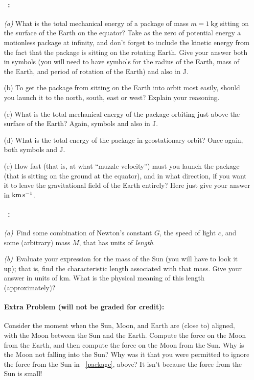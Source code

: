 \documentclass[12pt]{article}
\begin{document}
\paragraph{\problemname~\theproblem:}\label{rocket}%
\textsl{(a)} What is the total mechanical energy of a package of mass
$m= 1~\mathrm{kg}$ sitting on the surface of the Earth on the equator?
Take as the zero of potential energy a motionless package at infinity,
and don't forget to include the kinetic energy from the fact that the
package is sitting on the rotating Earth.  Give your answer both in
symbols (you will need to have symbols for the radius of the Earth,
mass of the Earth, and period of rotation of the Earth) and also in J.

(b) To get the package from sitting on the Earth into orbit most
easily, should you launch it to the north, south, east or west?
Explain your reasoning.

(c) What is the total mechanical energy of the package orbiting just
above the surface of the Earth? Again, symbols and also in J.

(d) What is the total energy of the package in geostationary
orbit? Once again, both symbols and J.

(e) How fast (that is, at what ``muzzle velocity'') must you launch
the package (that is sitting on the ground at the equator), and in what direction, if
you want it to leave the gravitational field of the Earth entirely?
Here just give your answer in $\mathrm{km}\,\mathrm{s}^{-1}$.

\paragraph{\problemname~\theproblem:}%
\textsl{(a)}~Find some combination of Newton's constant $G$, the speed of light $c$, and
some (arbitrary) mass $M$, that has units of \emph{length}.

\textsl{(b)}~Evaluate your expression for the mass of the Sun (you
will have to look it up); that is, find the characteristic length
associated with that mass.  Give your answer in units of km.  What is
the physical meaning of this length (approximately)?

\paragraph{Extra Problem (will not be graded for credit):}%
Consider the moment when the Sun, Moon, and Earth are (close to)
aligned, with the Moon between the Sun and the Earth. Compute the
force on the Moon from the Earth, and then compute the force on the
Moon from the Sun. Why is the Moon not falling into the Sun? Why was
it that you were permitted to ignore the force from the
Sun in \problemname~\ref{package}, above? It isn't because the force
from the Sun is small!
\end{document}
